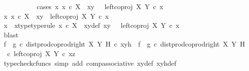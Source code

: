 \begin{isabellebody}
\ \ \ \ \ \ \ \ \ \ \isamarkupfalse%
{\isacharparenleft}{\kern0pt}cases\ {\isachardoublequoteopen}{\isasymexists}x{\isachardot}{\kern0pt}\ x\ {\isasymin}\isactrlsub c\ X\ {\isasymand}\ xy\ {\isacharequal}{\kern0pt}\ \ left{\isacharunderscore}{\kern0pt}coproj\ X\ Y\ {\isasymcirc}\isactrlsub c\ x{\isachardoublequoteclose}{\isacharparenright}{\kern0pt}\isanewline
\ \ \ \ \ \ \ \ \ \ \ \ \isamarkupfalse%
\ {\isachardoublequoteopen}{\isasymexists}x{\isachardot}{\kern0pt}\ x\ {\isasymin}\isactrlsub c\ X\ {\isasymand}\ xy\ {\isacharequal}{\kern0pt}\ left{\isacharunderscore}{\kern0pt}coproj\ X\ Y\ {\isasymcirc}\isactrlsub c\ x{\isachardoublequoteclose}\isanewline
\ \ \ \ \ \ \ \ \ \ \ \ \isamarkupfalse%
\ \isamarkupfalse%
\ x\ \ x{\isacharunderscore}{\kern0pt}type{\isacharbrackleft}{\kern0pt}type{\isacharunderscore}{\kern0pt}rule{\isacharbrackright}{\kern0pt}{\isacharcolon}{\kern0pt}\ {\isachardoublequoteopen}x\ {\isasymin}\isactrlsub c\ X{\isachardoublequoteclose}\ \ xy{\isacharunderscore}{\kern0pt}def{\isacharcolon}{\kern0pt}\ {\isachardoublequoteopen}xy\ {\isacharequal}{\kern0pt}\ \ left{\isacharunderscore}{\kern0pt}coproj\ X\ Y\ {\isasymcirc}\isactrlsub c\ x{\isachardoublequoteclose}\isanewline
\ \ \ \ \ \ \ \ \ \ \ \ \ \ \isamarkupfalse%
\ blast\isanewline
\ \ \ \ \ \ \ \ \ \ \ \ \isamarkupfalse%
\ {\isachardoublequoteopen}{\isacharparenleft}{\kern0pt}f\isactrlsup {\isasymflat}\ {\isasymamalg}\ g\isactrlsup {\isasymflat}\ {\isasymcirc}\isactrlsub c\ dist{\isacharunderscore}{\kern0pt}prod{\isacharunderscore}{\kern0pt}coprod{\isacharunderscore}{\kern0pt}right\ X\ Y\ H{\isacharparenright}{\kern0pt}\ {\isasymcirc}\isactrlsub c\ xyh\ {\isacharequal}{\kern0pt}\ {\isacharparenleft}{\kern0pt}f\isactrlsup {\isasymflat}\ {\isasymamalg}\ g\isactrlsup {\isasymflat}{\isacharparenright}{\kern0pt}\ {\isasymcirc}\isactrlsub c\ {\isacharparenleft}{\kern0pt}dist{\isacharunderscore}{\kern0pt}prod{\isacharunderscore}{\kern0pt}coprod{\isacharunderscore}{\kern0pt}right\ X\ Y\ H\ \ {\isasymcirc}\isactrlsub c\ {\isasymlangle}left{\isacharunderscore}{\kern0pt}coproj\ X\ Y\ {\isasymcirc}\isactrlsub c\ x{\isacharcomma}{\kern0pt}z{\isasymrangle}{\isacharparenright}{\kern0pt}{\isachardoublequoteclose}\isanewline
\ \ \ \ \ \ \ \ \ \ \ \ \ \ \isamarkupfalse%
\ {\isacharparenleft}{\kern0pt}typecheck{\isacharunderscore}{\kern0pt}cfuncs{\isacharcomma}{\kern0pt}\ simp\ add{\isacharcolon}{\kern0pt}\ comp{\isacharunderscore}{\kern0pt}associative{}\ xy{\isacharunderscore}{\kern0pt}def\ xyh{\isacharunderscore}{\kern0pt}def{\isacharparenright}{\kern0pt}\isanewline

\end{isabellebody}
